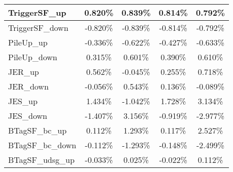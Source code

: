 \begin{table}[]
{\begin{tabular}{|l|c|c|c|c|}
TriggerSF\_up                               & 0.820\%                                & 0.839\%                                & 0.814\%                               & 0.792\%                                \\ \hline 
TriggerSF\_down                             & -0.820\%                              & -0.839\%                              & -0.814\%                             & -0.792\%                              \\ \hline 
PileUp\_up                             & -0.336\%                              & -0.622\%                              & -0.427\%                             & -0.633\%                              \\ \hline 
PileUp\_down                           & 0.315\%                            & 0.601\%                            & 0.390\%                           & 0.610\%                            \\ \hline 
JER\_up                         & 0.562\%                          & -0.045\%                          & 0.255\%                         & 0.718\%                          \\ \hline     
JER\_down                       & -0.056\%                        & 0.543\%                        & 0.136\%                       & -0.089\%                        \\ \hline    
JES\_up                                 & 1.434\%                                  & -1.042\%                                  & 1.728\%                                 & 3.134\%                                  \\ \hline    
JES\_down                               & -1.407\%                                & 3.156\%                                & -0.919\%                               & -2.977\%                                \\ \hline    
BTagSF\_bc\_up                              & 0.112\%                               & 1.293\%                               & 0.117\%                              & 2.527\%                               \\ \hline    
BTagSF\_bc\_down                            & -0.112\%                             & -1.293\%                             & -0.148\%                            & -2.499\%                             \\ \hline    
BTagSF\_udsg\_up                            & -0.033\%                             & 0.025\%                             & -0.022\%                            & 0.112\%                             \\ \hline     

\end{tabular}}
\end{table}

